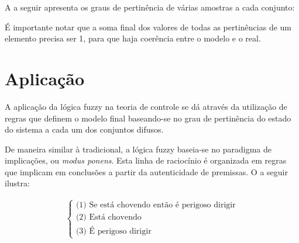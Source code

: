 A  a seguir apresenta os graus de pertinência de várias amostras a cada conjunto:

\begin{table}[!ht]
	\caption{Tabela de Exemplos}
	\label{tabPertEx}
	\small
	\centering
\end{table}

É importante notar que a soma final dos valores de todas as pertinências de um elemento precisa ser 1, para que haja coerência entre o modelo e o real.

\section{Aplicação}
A aplicação da lógica fuzzy na teoria de controle se dá através da utilização de regras que definem o modelo final baseando-se no grau de pertinência do estado do sistema a cada um dos conjuntos difusos. 

De maneira similar à tradicional, a lógica fuzzy baseia-se no paradigma de implicações, ou \textit{modus ponens}. Esta linha de raciocínio é organizada em regras que implicam em conclusões a partir da autenticidade de premissas. O  a seguir ilustra:

\begin{align} \label{eqRegrasEx}
\begin{cases}
	\text{(1) Se está  chovendo então é perigoso dirigir}\\
	\text{(2) Está chovendo }\\
	\text{(3) É perigoso dirigir}
\end{cases}		
\end{align}

